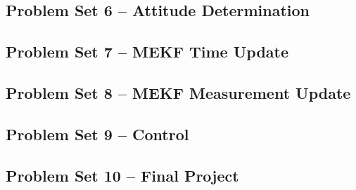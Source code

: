 \newpage
\subsection{Problem Set 6 – Attitude Determination}






\newpage
\subsection{Problem Set 7 – MEKF Time Update}


\newpage
\subsection{Problem Set 8 – MEKF Measurement Update}




\newpage
\subsection{Problem Set 9 – Control}


\newpage
\subsection{Problem Set 10 – Final Project}
